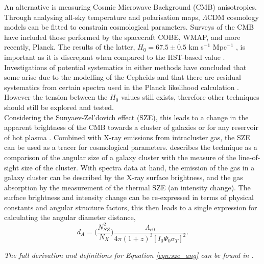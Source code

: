 \documentclass[12pt, onecolumn]{revtex4}    %
\begin{document}
An alternative is measuring Cosmic Microwave Background (CMB) anisotropies. Through analysing all-sky temperature and polarisation maps, $\Lambda$CDM cosmology models can be fitted to constrain cosmological parameters. Surveys of the CMB have included those performed by the spacecraft COBE, WMAP, and more recently, Planck. The results of the latter, $H_0=67.5\pm0.5$ km s$^{-1}$ Mpc$^{-1}$ \citep{2018arXiv180706209P}, is important as it is discrepant when compared to the HST-based value \citep{2018ApJ...855..136R}. Investigations of potential systematics in either methods have concluded that some arise due to the modelling of the Cepheids \citep{2018MNRAS.477.4534F} and that there are residual systematics from certain spectra used in the Planck likelihood calculation \citep{2015PhRvD..91b3518S}. However the tension between the $H_0$ values still exists, therefore other techniques should still be explored and tested. \\

Considering the Sunyaev-Zel'dovich effect (SZE), this leads to a change in the apparent brightness of the CMB towards a cluster of galaxies or for any reservoir of hot plasma \citep{1999PhR...310...97B, 2002ARA&A..40..643C}. Combined with X-ray emissions from intracluster gas, the SZE can be used as a tracer for cosmological parameters. \cite{1999PhR...310...97B} describes the technique as a comparison of the angular size of a galaxy cluster with the measure of the line-of-sight size of the cluster. With spectra data at hand, the emission of the gas in a galaxy cluster can be described by the X-ray surface brightness, and the gas absorption by the measurement of the thermal SZE (an intensity change).  The surface brightness and intensity change can be re-expressed in terms of physical constants and angular structure factors, this then leads to a single expression for calculating the angular diameter distance, 
\begin{equation}
d_A = \Bigg( \frac{N^2_{SZ}}{N_X} \Bigg)\frac{\Lambda_{e0}}{4\pi (1+z)^3 [I_0 \Psi_0 \sigma_T]^2}.
\label{eqn:sze_ang}
\end{equation}

\textit{The full derivation and definitions for Equation \ref{eqn:sze_ang} can be found in \cite{1997ApJ...480..449H}.} \\
\end{document}
